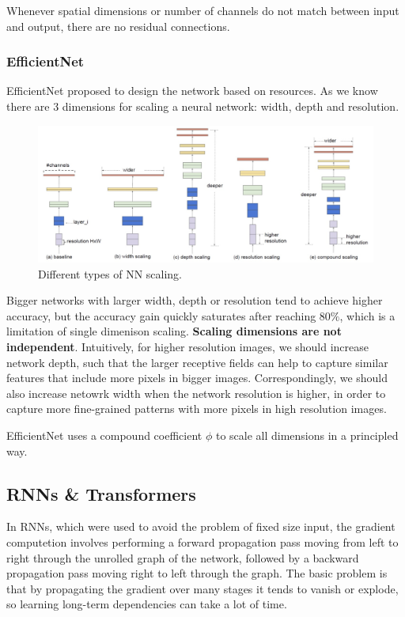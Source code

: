 \documentclass{article}
\begin{document}
Whenever spatial dimensions or number of channels do not match between input and output, there are no residual connections.

\subsubsection{EfficientNet}
EfficientNet proposed to design the network based on resources.
As we know there are 3 dimensions for scaling a neural network: width, depth and resolution.

\begin{figure}[htbp]
  \centering
  \includegraphics[width=0.8\linewidth]{./img/efficientnet.jpg}
  \caption{Different types of NN scaling.}
\end{figure}

Bigger networks with larger width, depth or resolution tend to achieve higher accuracy, but the accuracy gain quickly saturates after reaching $80 \%$, which is a limitation of single dimenison scaling.
\textbf{Scaling dimensions are not independent}. Intuitively, for higher resolution images, we should increase network depth, such that the larger receptive fields can help to capture similar features that include more pixels in bigger images.
Correspondingly, we should also increase netowrk width when the network resolution is higher, in order to capture more fine-grained patterns with more pixels in high resolution images.

EfficientNet  uses a compound coefficient $\phi$ to scale all dimensions in a principled way.

\subsection{RNNs \& Transformers}

In RNNs, which were used to avoid the problem of fixed size input, the gradient computetion involves performing a forward propagation pass moving from left to right through the unrolled graph of the network, followed by a backward propagation pass moving right to left through the graph.
The basic problem is that by propagating the gradient over many stages it tends to vanish or explode, so learning long-term dependencies can take a lot of time.
\end{document}
